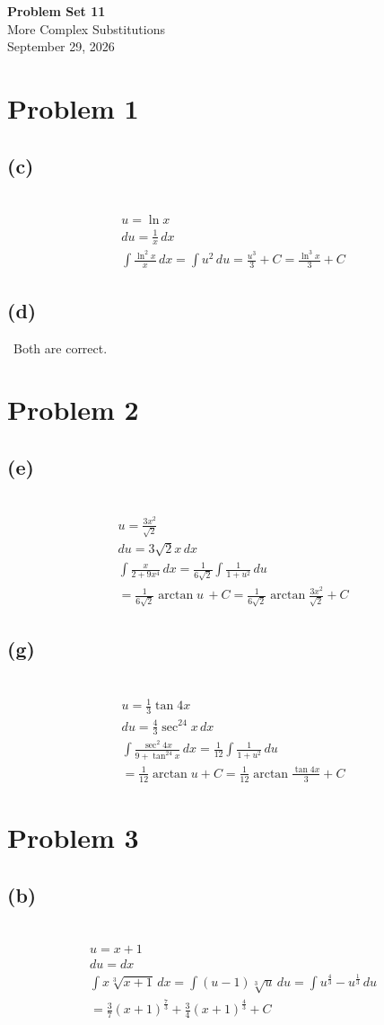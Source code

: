 \documentclass[12pt]{article}
\newcommand*{\cbrt}[1]{\ensuremath{\sqrt[3]{#1}}}
\newcommand{\problem}[1]{\section{Problem #1}}
\newcommand{\subproblem}[1]{\subsection{(#1)} \,}
\begin{document}
\vspace*{0cm}

\begin{center}
    {\Large \bfseries Problem Set 11} \\[0.5cm]
    {\large More Complex Substitutions} \\[0.35cm]
    {\normalsize September 29, 2026}
\end{center}


\problem{1}

\subproblem{c}
\begin{gather*}
    u=\ln x\\
    du= \frac{1}{x}\, dx\\
    \int \frac{\ln^2x}{x}\, dx = \int u^2\, du = \frac{u^3}{3}+C=\boxed{\frac{\ln^3x}{3}+C}
\end{gather*}

\subproblem{d}
Both are correct.

\problem{2}

\subproblem{e}
\begin{gather*}
    u=\frac{3x^2}{\sqrt{2}}\\
    du=3\sqrt{2}x\, dx\\
    \int \frac{x}{2+9x^4}\, dx=\frac{1}{6\sqrt{2}}\int \frac{1}{1+u^2}\, du\\ = \frac{1}{6\sqrt{2}} \arctan u\,+C= \boxed{\frac{1}{6\sqrt{2}} \arctan \frac{3x^2}{\sqrt{2}}+C}
\end{gather*}

\subproblem{g}
\begin{gather*}
    u=\frac{1}{3}\tan 4x\\
    du=\frac{4}{3}\sec^24x\, dx\\
    \int \frac{\sec^2 4x}{9+\tan^24x}\, dx=\frac{1}{12}\int \frac{1}{1+u^2} \, du \\= \frac{1}{12}\arctan u+C =\boxed{\frac{1}{12}\arctan \frac{\tan 4x}{3}+C}
\end{gather*}

\problem{3}

\subproblem{b}
\begin{gather*}
    u=x+1\\
    du=dx\\
    \int x\cbrt{x+1}\, dx = \int (u-1)\cbrt{u} \, du = \int u^\frac{4}{3}-u^\frac{1}{3}\, du \\= \boxed{\frac{3}{7}(x+1)^\frac{7}{3}+\frac{3}{4}(x+1)^\frac{4}{3}+C}
\end{gather*}
\end{document}
